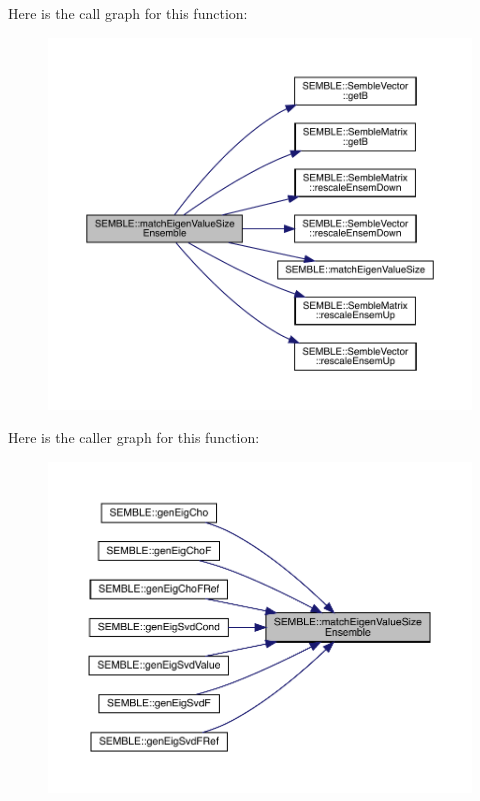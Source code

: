 Here is the call graph for this function\+:
\nopagebreak
\begin{figure}[H]
\begin{center}
\leavevmode
\includegraphics[width=350pt]{d7/dfd/namespaceSEMBLE_ad811e95bd734c5aefb5b45cd80f49f87_cgraph}
\end{center}
\end{figure}
Here is the caller graph for this function\+:
\nopagebreak
\begin{figure}[H]
\begin{center}
\leavevmode
\includegraphics[width=350pt]{d7/dfd/namespaceSEMBLE_ad811e95bd734c5aefb5b45cd80f49f87_icgraph}
\end{center}
\end{figure}
\mbox{\label{namespaceSEMBLE_a7e0af5033a46ccd68accbec344be1f4e}} 
